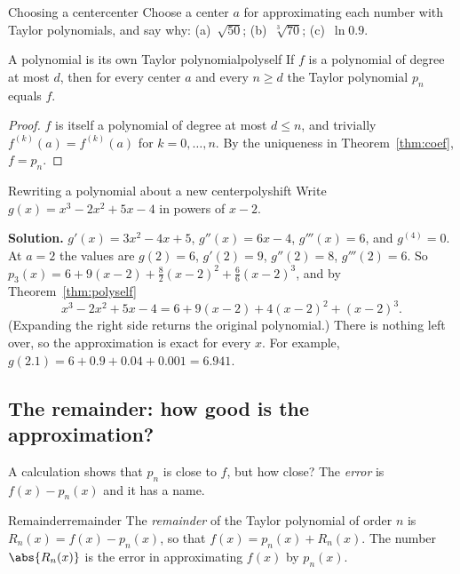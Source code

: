 \documentclass[11pt]{article}
\begin{document}
\begin{kc}{Choosing a center}{center}
Choose a center $a$ for approximating each number with Taylor polynomials, and say why: (a)~$\sqrt{50}$; \quad (b)~$\sqrt[3]{70}$; \quad (c)~$\ln0.9$.
\end{kc}

\begin{thm}{A polynomial is its own Taylor polynomial}{polyself}
If $f$ is a polynomial of degree at most $d$, then for every center $a$ and every $n\ge d$ the Taylor polynomial $p_n$ equals $f$.
\end{thm}
\begin{proof}
$f$ is itself a polynomial of degree at most $d\le n$, and trivially $f^{(k)}(a)=f^{(k)}(a)$ for $k=0,\dots,n$. By the uniqueness in Theorem~\ref{thm:coef}, $f=p_n$.
\end{proof}

\begin{exmp}{Rewriting a polynomial about a new center}{polyshift}
Write $g(x)=x^3-2x^2+5x-4$ in powers of $x-2$.

\textbf{Solution.} $g'(x)=3x^2-4x+5$, $g''(x)=6x-4$, $g'''(x)=6$, and $g^{(4)}=0$. At $a=2$ the values are $g(2)=6$, $g'(2)=9$, $g''(2)=8$, $g'''(2)=6$. So $p_3(x)=6+9(x-2)+\frac82(x-2)^2+\frac66(x-2)^3$, and by Theorem~\ref{thm:polyself}
\[
x^3-2x^2+5x-4=6+9(x-2)+4(x-2)^2+(x-2)^3 .
\]
(Expanding the right side returns the original polynomial.) There is nothing left over, so the approximation is exact for every $x$. For example, $g(2.1)=6+0.9+0.04+0.001=6.941$.
\end{exmp}

\subsection*{The remainder: how good is the approximation?}

A calculation shows that $p_n$ is close to $f$, but how close? The \emph{error} is $f(x)-p_n(x)$ and it has a name.

\begin{defn}{Remainder}{remainder}
The \emph{remainder} of the Taylor polynomial of order $n$ is $R_n(x)=f(x)-p_n(x)$, so that $f(x)=p_n(x)+R_n(x)$. The number $\abs{R_n(x)}$ is the error in approximating $f(x)$ by $p_n(x)$.
\end{defn}
\end{document}
